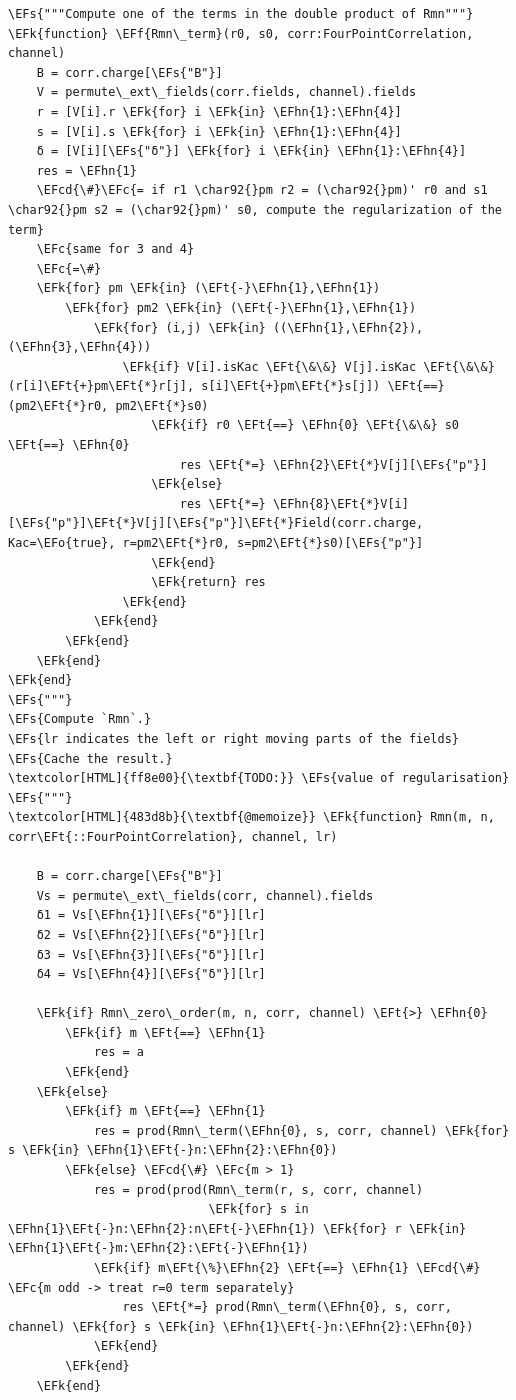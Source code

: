 \documentclass[a4paper]{article}
\numberwithin{equation}{section}
\newcommand{\EFc}[1]{\textcolor{EFc}{#1}} %
\newcommand{\EFcd}[1]{\textcolor{EFcd}{#1}} %
\newcommand{\EFs}[1]{\textcolor{EFs}{#1}} %
\newcommand{\EFk}[1]{\textcolor{EFk}{#1}} %
\newcommand{\EFf}[1]{\textcolor{EFf}{#1}} %
\newcommand{\EFt}[1]{\textcolor{EFt}{#1}} %
\newcommand{\EFo}[1]{\textcolor{EFo}{#1}} %
\newcommand{\EFhn}[1]{\textcolor{EFhn}{#1}} %
\begin{document}
\begin{itemize}
\begin{Code}
\begin{Verbatim}
\EFs{"""Compute one of the terms in the double product of Rmn"""}
\EFk{function} \EFf{Rmn\_term}(r0, s0, corr:FourPointCorrelation, channel)
    B = corr.charge[\EFs{"B"}]
    V = permute\_ext\_fields(corr.fields, channel).fields
    r = [V[i].r \EFk{for} i \EFk{in} \EFhn{1}:\EFhn{4}]
    s = [V[i].s \EFk{for} i \EFk{in} \EFhn{1}:\EFhn{4}]
    δ = [V[i][\EFs{"δ"}] \EFk{for} i \EFk{in} \EFhn{1}:\EFhn{4}]
    res = \EFhn{1}
    \EFcd{\#}\EFc{= if r1 \char92{}pm r2 = (\char92{}pm)' r0 and s1 \char92{}pm s2 = (\char92{}pm)' s0, compute the regularization of the term}
    \EFc{same for 3 and 4}
    \EFc{=\#}
    \EFk{for} pm \EFk{in} (\EFt{-}\EFhn{1},\EFhn{1})
        \EFk{for} pm2 \EFk{in} (\EFt{-}\EFhn{1},\EFhn{1})
            \EFk{for} (i,j) \EFk{in} ((\EFhn{1},\EFhn{2}), (\EFhn{3},\EFhn{4}))
                \EFk{if} V[i].isKac \EFt{\&\&} V[j].isKac \EFt{\&\&} (r[i]\EFt{+}pm\EFt{*}r[j], s[i]\EFt{+}pm\EFt{*}s[j]) \EFt{==} (pm2\EFt{*}r0, pm2\EFt{*}s0)
                    \EFk{if} r0 \EFt{==} \EFhn{0} \EFt{\&\&} s0 \EFt{==} \EFhn{0}
                        res \EFt{*=} \EFhn{2}\EFt{*}V[j][\EFs{"p"}]
                    \EFk{else}
                        res \EFt{*=} \EFhn{8}\EFt{*}V[i][\EFs{"p"}]\EFt{*}V[j][\EFs{"p"}]\EFt{*}Field(corr.charge, Kac=\EFo{true}, r=pm2\EFt{*}r0, s=pm2\EFt{*}s0)[\EFs{"p"}]
                    \EFk{end}
                    \EFk{return} res
                \EFk{end}
            \EFk{end}
        \EFk{end}
    \EFk{end}
\EFk{end}
\EFs{"""}
\EFs{Compute `Rmn`.}
\EFs{lr indicates the left or right moving parts of the fields}
\EFs{Cache the result.}
\textcolor[HTML]{ff8e00}{\textbf{TODO:}} \EFs{value of regularisation}
\EFs{"""}
\textcolor[HTML]{483d8b}{\textbf{@memoize}} \EFk{function} Rmn(m, n, corr\EFt{::FourPointCorrelation}, channel, lr)

    B = corr.charge[\EFs{"B"}]
    Vs = permute\_ext\_fields(corr, channel).fields
    δ1 = Vs[\EFhn{1}][\EFs{"δ"}][lr]
    δ2 = Vs[\EFhn{2}][\EFs{"δ"}][lr]
    δ3 = Vs[\EFhn{3}][\EFs{"δ"}][lr]
    δ4 = Vs[\EFhn{4}][\EFs{"δ"}][lr]

    \EFk{if} Rmn\_zero\_order(m, n, corr, channel) \EFt{>} \EFhn{0}
        \EFk{if} m \EFt{==} \EFhn{1}
            res = a
        \EFk{end}
    \EFk{else}
        \EFk{if} m \EFt{==} \EFhn{1}
            res = prod(Rmn\_term(\EFhn{0}, s, corr, channel) \EFk{for} s \EFk{in} \EFhn{1}\EFt{-}n:\EFhn{2}:\EFhn{0})
        \EFk{else} \EFcd{\#} \EFc{m > 1}
            res = prod(prod(Rmn\_term(r, s, corr, channel)
                            \EFk{for} s in \EFhn{1}\EFt{-}n:\EFhn{2}:n\EFt{-}\EFhn{1}) \EFk{for} r \EFk{in} \EFhn{1}\EFt{-}m:\EFhn{2}:\EFt{-}\EFhn{1})
            \EFk{if} m\EFt{\%}\EFhn{2} \EFt{==} \EFhn{1} \EFcd{\#} \EFc{m odd -> treat r=0 term separately}
                res \EFt{*=} prod(Rmn\_term(\EFhn{0}, s, corr, channel) \EFk{for} s \EFk{in} \EFhn{1}\EFt{-}n:\EFhn{2}:\EFhn{0})
            \EFk{end}
        \EFk{end}
    \EFk{end}


\end{Verbatim}
\end{Code}
\end{itemize}
\end{document}
